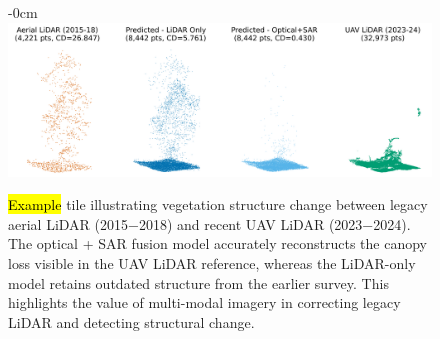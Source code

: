 \documentclass[remotesensing,article,accept,pdftex,moreauthors]{Definitions/mdpi}
\begin{document}
\begin{figure}[H]
\begin{adjustwidth}{-\extralength}{0cm}
    \centering
    \includegraphics[width=0.85\linewidth]{figures/single_veg_loss_example.png}
    \end{adjustwidth}
    \caption{\hl{Example} %
 tile illustrating vegetation structure change between legacy aerial LiDAR (\mbox{2015−2018}) and recent UAV LiDAR (2023−2024). The optical + SAR fusion model accurately reconstructs the canopy loss visible in the UAV LiDAR reference, whereas the LiDAR-only model retains outdated structure from the earlier survey. This highlights the value of multi-modal imagery in correcting legacy LiDAR and detecting structural change.}
    \label{fig:single_veg_loss_example}
\end{figure}


\vspace{-11pt}
\end{document}
